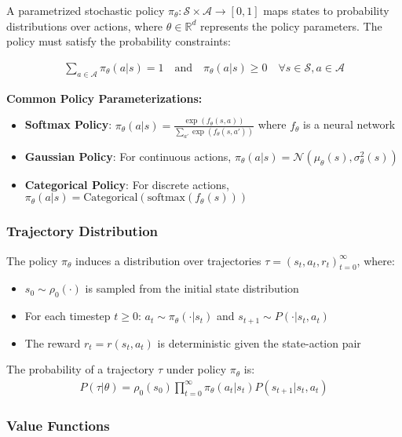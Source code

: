 A parametrized stochastic policy $\pi_{\theta}: \mathcal{S} \times \mathcal{A} \rightarrow [0, 1]$ maps states to probability distributions over actions, where $\theta \in \mathbb{R}^d$ represents the policy parameters. The policy must satisfy the probability constraints:

\begin{align}
    \sum_{a \in \mathcal{A}} \pi_{\theta}(a|s) = 1 \quad \text{and} \quad \pi_{\theta}(a|s) \geq 0 \quad \forall s \in \mathcal{S}, a \in \mathcal{A}
\end{align}

\textbf{Common Policy Parameterizations:}
\begin{itemize}
    \item \textbf{Softmax Policy}: $\pi_{\theta}(a|s) = \frac{\exp(f_{\theta}(s,a))}{\sum_{a'} \exp(f_{\theta}(s,a'))}$ where $f_{\theta}$ is a neural network
    \item \textbf{Gaussian Policy}: For continuous actions, $\pi_{\theta}(a|s) = \mathcal{N}(\mu_{\theta}(s), \sigma_{\theta}^2(s))$
    \item \textbf{Categorical Policy}: For discrete actions, $\pi_{\theta}(a|s) = \text{Categorical}(\text{softmax}(f_{\theta}(s)))$
\end{itemize}

\subsubsection{Trajectory Distribution}

The policy $\pi_{\theta}$ induces a distribution over trajectories $\tau = (s_t, a_t, r_t)_{t=0}^{\infty}$, where:
\begin{itemize}
    \item $s_0 \sim \rho_0(\cdot)$ is sampled from the initial state distribution
    \item For each timestep $t \geq 0$: $a_t \sim \pi_{\theta}(\cdot|s_t)$ and $s_{t+1} \sim P(\cdot|s_t, a_t)$
    \item The reward $r_t = r(s_t, a_t)$ is deterministic given the state-action pair
\end{itemize}

The probability of a trajectory $\tau$ under policy $\pi_{\theta}$ is:
\begin{align}
    P(\tau|\theta) = \rho_0(s_0) \prod_{t=0}^{\infty} \pi_{\theta}(a_t|s_t) P(s_{t+1}|s_t, a_t)
\end{align}

\subsubsection{Value Functions}


